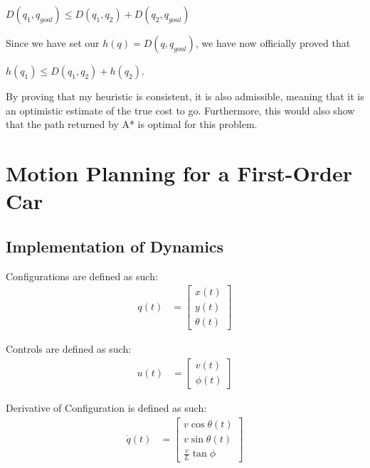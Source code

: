 \documentclass{article}
\begin{document}
$D(q_1, q_{goal}) \leq D(q_1, q_2) + D(q_2, q_{goal})$ \newline 

Since we have set our $h(q) = D(q, q_{goal})$, we have now officially proved that 

$h(q_1) \leq D(q_1, q_2) + h(q_2)$. \newline 

By proving that my heuristic is consistent, it is also admissible, meaning that it is an optimistic estimate of the true cost to go. Furthermore, this would also show that the path returned by A* is optimal for this problem. 

\newpage 
\maketitle
\section{Motion Planning for a First-Order Car}
\subsection{Implementation of Dynamics}
Configurations are defined as such: \newline 
\begin{align}
    q(t) &= \begin{bmatrix}
           x(t) \\
           y(t) \\
           \theta(t)
         \end{bmatrix}
\end{align}

Controls are defined as such: \newline 
\begin{align}
    u(t) &= \begin{bmatrix}
           v(t) \\
           \phi(t)
         \end{bmatrix}
\end{align}

Derivative of Configuration is defined as such: \newline 
\begin{align}
    \dot{q}(t) &= \begin{bmatrix}
           v\cos{\theta(t)} \\
           v\sin{\theta(t)} \\
           \frac{v}{L} \tan{\phi}
         \end{bmatrix}
\end{align}
\end{document}
